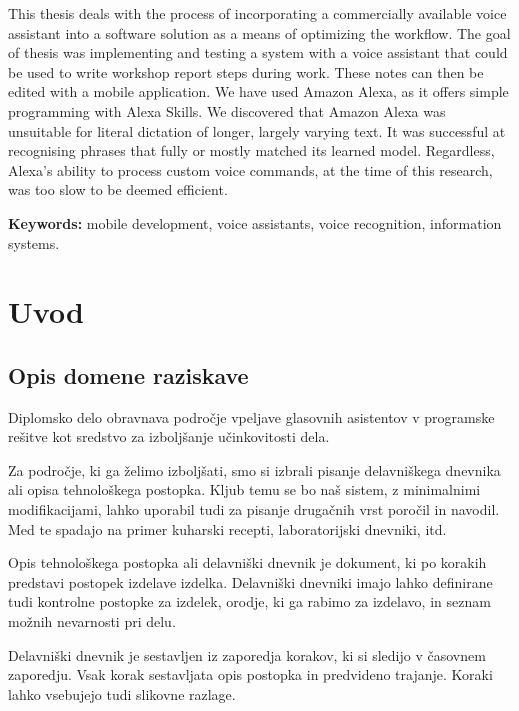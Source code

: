 \documentclass[a4paper, 12pt]{book}
\newcommand{\tkeywordsEn}{mobile development, voice assistants, voice recognition, information systems}
\newcommand{\clearemptydoublepage}{\newpage{\pagestyle{empty}\cleardoublepage}}
\begin{document}
\noindent This thesis deals with the process of incorporating a commercially available voice assistant into a software solution as a means of optimizing the workflow.
The goal of thesis was implementing and testing a system with a voice assistant that could be used to write workshop report steps during work.
These notes can then be edited with a mobile application.
We have used Amazon Alexa, as it offers simple programming with Alexa Skills.
We discovered that Amazon Alexa was unsuitable for literal dictation of longer, largely varying text.
It was successful at recognising phrases that fully or mostly matched its learned model.
Regardless, Alexa's ability to process custom voice commands, at the time of this research, was too slow to be deemed efficient.

\bigskip

\noindent\textbf{Keywords:} \tkeywordsEn.
\clearemptydoublepage

\mainmatter
\setcounter{page}{1}
\pagestyle{fancy}

\chapter{Uvod}
\section{Opis domene raziskave}

Diplomsko delo obravnava področje vpeljave glasovnih asistentov v programske rešitve kot sredstvo za izboljšanje učinkovitosti dela.

Za področje, ki ga želimo izboljšati, smo si izbrali pisanje delavniškega dnevnika ali opisa tehnološkega postopka.
Kljub temu se bo naš sistem, z minimalnimi modifikacijami, lahko uporabil tudi za pisanje drugačnih vrst poročil in navodil.
Med te spadajo na primer kuharski recepti, laboratorijski dnevniki, itd.

Opis tehnološkega postopka ali delavniški dnevnik je dokument, ki po korakih predstavi postopek izdelave izdelka.
Delavniški dnevniki imajo lahko definirane tudi kontrolne postopke za izdelek, orodje, ki ga rabimo za izdelavo, in seznam možnih nevarnosti pri delu.

Delavniški dnevnik je sestavljen iz zaporedja korakov, ki si sledijo v časovnem zaporedju.
Vsak korak sestavljata opis postopka in predvideno trajanje.
Koraki lahko vsebujejo tudi slikovne razlage.
\end{document}
